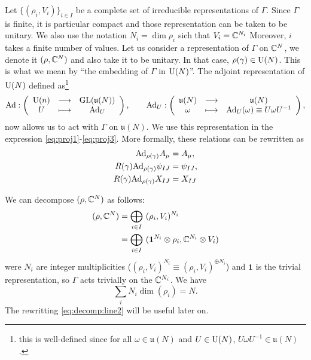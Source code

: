         Let $\{(\rho_i,V_i)\}_{i\in I}$ be a complete set of irreducible representations of $\Gamma$. Since $\Gamma$ is finite, it is particular compact and those representation can be taken to be unitary. We also use the notation $N_i=\dim\rho_i$ sich that $V_i=\mathbb{C}^{N_i}$ Moreover, $i$ takes a finite number of values. Let us consider a representation of $\Gamma$ on $\mathbb{C}^N$, we denote it $(\rho,\mathbb{C}^N)$ and also take it to be unitary. In that case, $\rho(\gamma)\in\text{U}(N)$. This is what we mean by ``the embedding of $\Gamma$ in $\text{U}(N)$''. The adjoint representation of $\text{U}(N)$ defined as\footnote{this is well-defined since for all $\omega\in\mathfrak{u}(N)$ and $U\in\text{U}(N)$, $U\omega U^{-1}\in\mathfrak{u}(N)$.}
        \begin{equation}
            \text{Ad}:\left(
            \begin{array}{ccc}
                \text{U}(n) & \longrightarrow & \text{GL}(\mathfrak{u}(N)) \\
                U & \longmapsto & \text{Ad}_U
            \end{array}
            \right),\qquad
            \text{Ad}_U:\left(
            \begin{array}{ccc}
                \mathfrak{u}(N) & \longrightarrow & \mathfrak{u}(N) \\
                \omega & \longmapsto & \text{Ad}_U(\omega)\equiv U\omega U^{-1}
            \end{array}
            \right),
        \end{equation}
        now allows us to act with $\Gamma$ on $\mathfrak{u}(N)$. We use this representation in the expression \eqref{eq:proj1}-\eqref{eq:proj3}. More formally, these relations can be rewritten as
        \begin{align}
            \text{Ad}_{\rho(\gamma)}A_\mu  &= A_\mu,\\
            R(\gamma)\text{Ad}_{\rho(\gamma)}\psi_{IJ}  &= \psi_{IJ},\\
            R(\gamma)\text{Ad}_{\rho(\gamma)}X_{IJ} &= X_{IJ}
        \end{align}

        We can decompose $(\rho,\mathbb{C}^N)$ as follows:
        \begin{align}
            (\rho,\mathbb{C}^N) &= \bigoplus_{i\in I}~(\rho_i,V_i)^{N_i} \label{eq:decomp:line1} \\
            &= \bigoplus_{i\in I}~(\boldsymbol{1}^{N_i}\otimes\rho_i,\mathbb{C}^{N_i}\otimes V_i) \label{eq:decomp:line2}
        \end{align}
        were $N_i$ are integer multiplicities ($(\rho_i,V_i)^{N_i}\equiv(\rho_i,V_i)^{\oplus N_i}$) and $\boldsymbol{1}$ is the trivial representation, so $\Gamma$ acts trivially on the $\mathbb{C}^{N_i}$. We have
        \begin{equation}
            \sum_iN_i\dim(\rho_i)=N.
        \end{equation}
        The rewritting \eqref{eq:decomp:line2} will be useful later on.
        
